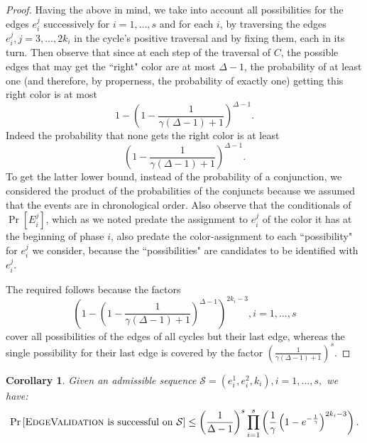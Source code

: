\documentclass{amsart}
\theoremstyle{plain}
\newtheorem{corollary}{Corollary}
\newcommand{\ValE}{\textsc{EdgeValidation}}
\begin{document}
\begin{proof}
  Having the above in mind,  we take into account  all possibilities for the edges $e_i^j$ successively for $i=1, \ldots, s$ and for each $i$, by traversing the edges $e_i^j, j=3, \ldots, 2k_i$ in the cycle's positive traversal and by fixing them, each in its turn. 
  Then   observe that  
  since at each step of the traversal of $C$, the possible edges that  may get the ``right" color are at most $\Delta -1$, the probability of at least one (and therefore, by properness, the  probability of exactly one)  getting this right color is at most \begin{equation*} 1- \left(1 -\frac{1}{\gamma(\Delta-1)+1}\right)^{\Delta-1}.\end{equation*}
  Indeed the probability that none gets the right color is at least $$ \left(1 -\frac{1}{\gamma(\Delta-1)+1}\right)^{\Delta-1}.$$  
  To get the latter lower bound,  instead of the probability of a conjunction, we considered the product of the probabilities of the conjuncts  because  we assumed that the events are in chronological order. Also observe that  the conditionals of $\Pr[E_i^j]$, which as we noted predate  
  the assignment to $e_i^j$ of the color it has at the beginning of phase $i$, also predate the color-assignment to each ``possibility" for $e_i^j$ we consider, because the ``possibilities" are candidates to be identified with $e_i^j$.    
  
  
  
  
      
  The required follows because the factors $$\left(1 - \left(1 -\frac{1}{\gamma(\Delta-1)+1}\right)^{\Delta-1}\right)^{2k_i-3}, i=1, \ldots, s$$ cover all possibilities of the edges of all cycles but their last edge, whereas the single possibility for their last edge is covered by the factor $\left(\frac{1}{\gamma(\Delta-1)+1}\right)^s.$ 
 \end{proof}
 

  
  \begin{corollary}\label{cor:boundadmissible}
Given an admissible  sequence ${\mathcal S}= (e^1_i, e^2_i, k_i), i=1, \ldots, s,$ we have:    
\begin{equation*}\label{eq:bound} \Pr\left[ \text{\ValE}  \text{\rm{ is successful on }} {\mathcal S}\right] 
\leq   \left(\frac{1}{\Delta-1}\right)^s  \prod_{i=1}^s \left(\frac{1}{\gamma}\left(1 -  e^{-\frac{1}{\gamma}} \right)^{2k_i-3}\right).
\end{equation*}
\end{corollary}
\end{document}
